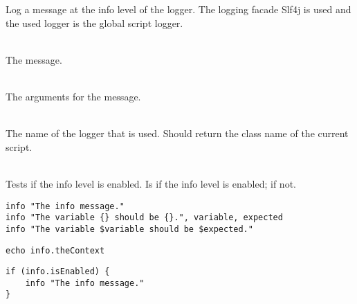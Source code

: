 %


Log a message at the info level of the logger.
The logging facade Slf4j\cite{slf4j13} is used and the used logger is
the global script logger.

\begin{asparadesc}
%
\item[\code{message}] \hfill \\
The message.
%
\item[\code{arguments...}] \hfill \\
The arguments for the message.
%
\item[\code{theContext}] \hfill \\
The name of the logger that is used. Should return the class name of the current
script.
%
\item[\code{isEnabled}] \hfill \\
Tests if the info level is enabled. Is  if the info level is enabled;
 if not.
%
\end{asparadesc}

\begin{lstlisting}[style=Groovybash, label={lst:example_info1}, title={%
Outputs a info logging message with arguments.}]
info "The info message."
info "The variable {} should be {}.", variable, expected
info "The variable $variable should be $expected."
\end{lstlisting}

\begin{lstlisting}[style=Groovybash, label={lst:example_info2}, title={%
Prints the name of the current logger.}]
echo info.theContext
\end{lstlisting}

\begin{lstlisting}[style=Groovybash, label={lst:example_info3}, title={%
Tests if the info level is enabled.}]
if (info.isEnabled) {
    info "The info message."
}
\end{lstlisting}


